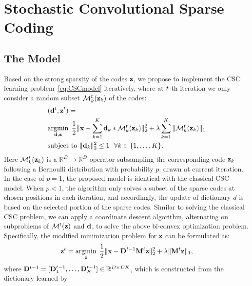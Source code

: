 \section{Stochastic Convolutional Sparse Coding}
\subsection{The Model}
Based on the strong sparsity of the codes $\code$, we propose to
implement the CSC learning problem~\eqref{eq:CSCmodel} iteratively,
where at $t$-th iteration we only consider a random subset
$\mathcal{M}_k^{\ite}(\code_k)$ of the codes:
\begin{equation} \label{eq:updatingFilter}
\begin{split}
    & (\filter^{\ite},\code^{\ite}) =  \\
    &\minimize{\filter,\code}  \frac{1}{2}\|\signal - \sum_{k=1}^{K} \filter_k * \mathcal{M}_k^{\ite}(\code_k) \|_2^2 + \lambda \sum_{k=1}^{K}\| \mathcal{M}_k^{\ite}(\code_k) \|_1  \\
    &\text{subject to} ~ \|\filter_k\|^2_2 \leq 1 ~~ \forall k \in \{1,\dots,K\}.
\end{split}
\end{equation}
Here $\mathcal{M}_k^{\ite}(\code_k)$ is a $\mathbb{R}^D \to \mathbb{R}^D$ operator subsampling the
corresponding code $\code_k$ following a Bernoulli distribution with
probability $p$, drawn at current iteration.
In the case of $p=1$, the proposed model is identical with the
classical CSC model. When $p<1$, the algorithm only solves a subset of
the sparse codes at chosen positions in each iteration, and
accordingly, the update of dictionary $d$ is based on the selected
portion of the sparse codes. Similar to solving the classical CSC
problem, we can apply a coordinate descent algorithm, alternating on
subproblems of $\mathcal{M}^{\ite}(\code)$ and $\filter$, to solve the above
bi-convex optimization problem. Specifically, the modified
minimization problem for $\code$ can be formulated as:
\begin{equation} \label{eq:updatingCode}
    \code^{\ite} = \minimize{\code} \frac{1}{2}\|\signal - \Filter^{\ite-1} \mask^{\ite} \code \|_2^2 + \lambda \|\mask^{\ite} \code\|_1,
\end{equation}
where $\Filter^{\ite-1} = [\Filter_1^{\ite-1}, \dots, \Filter_K^{\ite-1}] \in \mathbb{R}^{D
  \times DK}$, which is constructed from the dictionary learned by
